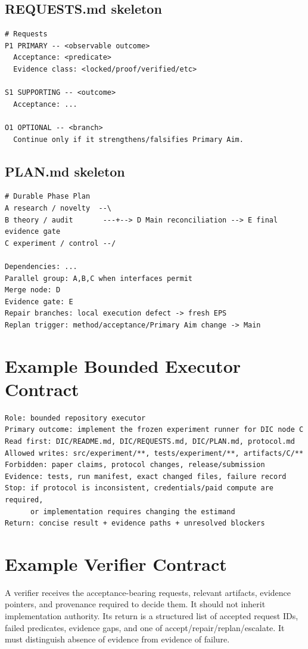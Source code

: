 \documentclass[11pt,a4paper]{article}
\begin{document}
\subsection*{REQUESTS.md skeleton}
\begin{lstlisting}[style=workflow]
# Requests
P1 PRIMARY -- <observable outcome>
  Acceptance: <predicate>
  Evidence class: <locked/proof/verified/etc>

S1 SUPPORTING -- <outcome>
  Acceptance: ...

O1 OPTIONAL -- <branch>
  Continue only if it strengthens/falsifies Primary Aim.
\end{lstlisting}

\subsection*{PLAN.md skeleton}
\begin{lstlisting}[style=workflow]
# Durable Phase Plan
A research / novelty  --\
B theory / audit       ---+--> D Main reconciliation --> E final evidence gate
C experiment / control --/

Dependencies: ...
Parallel group: A,B,C when interfaces permit
Merge node: D
Evidence gate: E
Repair branches: local execution defect -> fresh EPS
Replan trigger: method/acceptance/Primary Aim change -> Main
\end{lstlisting}

\section{Example Bounded Executor Contract}\label{sec:subagent-contract}
\begin{lstlisting}[style=workflow]
Role: bounded repository executor
Primary outcome: implement the frozen experiment runner for DIC node C
Read first: DIC/README.md, DIC/REQUESTS.md, DIC/PLAN.md, protocol.md
Allowed writes: src/experiment/**, tests/experiment/**, artifacts/C/**
Forbidden: paper claims, protocol changes, release/submission
Evidence: tests, run manifest, exact changed files, failure record
Stop: if protocol is inconsistent, credentials/paid compute are required,
      or implementation requires changing the estimand
Return: concise result + evidence paths + unresolved blockers
\end{lstlisting}

\section{Example Verifier Contract}\label{sec:verifier-contract}
A verifier receives the acceptance-bearing requests, relevant artifacts, evidence pointers, and provenance required to decide them. It should not inherit implementation authority. Its return is a structured list of accepted request IDs, failed predicates, evidence gaps, and one of accept/repair/replan/escalate. It must distinguish absence of evidence from evidence of failure.
\end{document}
